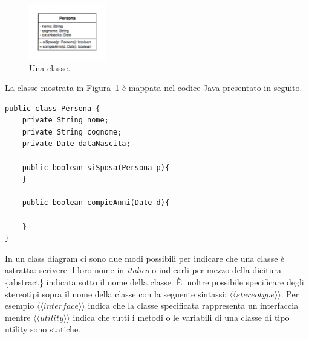 \documentclass{article}
\begin{document}
 \begin{figure}[h!]
  \centering
    \includegraphics[width=0.3\textwidth]{Img/Persona.pdf}
      \caption{Una classe.}
      \label{Fig:Classe}
\end{figure}

 
La classe mostrata in Figura~\ref{Fig:Classe} \`e mappata nel codice Java presentato in seguito.
\begin{lstlisting}
public class Persona {
    private String nome;
    private String cognome;
    private Date dataNascita;
    
    public boolean siSposa(Persona p){
    }
    
    public boolean compieAnni(Date d){
    
    }
}
\end{lstlisting}

In un class diagram ci sono due modi possibili per indicare che una classe \`e astratta: scrivere il loro nome in \textit{italico} o indicarli per mezzo della dicitura   \{abstract\} indicata sotto il nome della classe.
\`E inoltre possibile specificare degli stereotipi sopra il nome della classe con la seguente sintassi: $\langle \langle stereotype \rangle \rangle$. Per esempio $\langle \langle interface \rangle \rangle$ indica che la classe specificata rappresenta un interfaccia mentre 
$\langle \langle utility \rangle \rangle$ indica che tutti i metodi o le variabili di una classe di tipo utility sono statiche.
\end{document}
